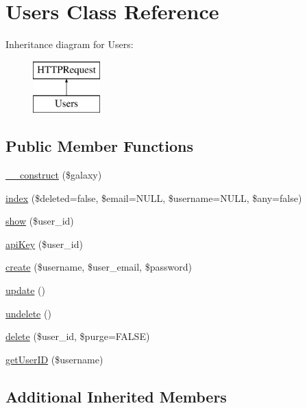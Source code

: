 \hypertarget{classUsers}{}\section{Users Class Reference}
\label{classUsers}
Inheritance diagram for Users\+:\begin{figure}[H]
\begin{center}
\leavevmode
\includegraphics[height=2.000000cm]{classUsers}
\end{center}
\end{figure}
\subsection*{Public Member Functions}
\begin{DoxyCompactItemize}
\item 
\hyperlink{classUsers_a769aa9c30c6d94646c99f51807743c5c}{\+\_\+\+\_\+construct} (\$galaxy)
\item 
\hyperlink{classUsers_aae18145ee4c1d9b9eca0fd8e2d8d65d3}{index} (\$deleted=false, \$email=N\+U\+LL, \$username=N\+U\+LL, \$any=false)
\item 
\hyperlink{classUsers_a9c2cf59f933e4e59745351a7533ce0ab}{show} (\$user\+\_\+id)
\item 
\hyperlink{classUsers_a3169049c092532596a5d5c664f2d3fc5}{api\+Key} (\$user\+\_\+id)
\item 
\hyperlink{classUsers_a38f0657d88ec8be06dfc36c261b01814}{create} (\$username, \$user\+\_\+email, \$password)
\item 
\hyperlink{classUsers_a73e0c5b2dbcf185f32d9e72c3934e866}{update} ()
\item 
\hyperlink{classUsers_a84360c2388a75d4282a8aa789f13b982}{undelete} ()
\item 
\hyperlink{classUsers_aca99b21a27c17a7ee22546fc8145257d}{delete} (\$user\+\_\+id, \$purge=F\+A\+L\+SE)
\item 
\hyperlink{classUsers_a60cb5a1a81e5b7cdd9ca990d55f4624b}{get\+User\+ID} (\$username)
\end{DoxyCompactItemize}
\subsection*{Additional Inherited Members}


